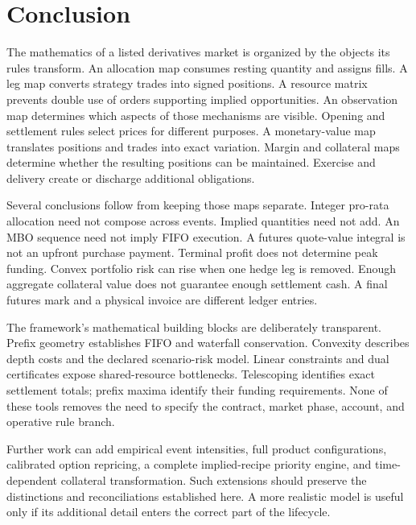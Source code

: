 \section{Conclusion}

The mathematics of a listed derivatives market is organized by the objects its rules transform. An allocation map consumes resting quantity and assigns fills. A leg map converts strategy trades into signed positions. A resource matrix prevents double use of orders supporting implied opportunities. An observation map determines which aspects of those mechanisms are visible. Opening and settlement rules select prices for different purposes. A monetary-value map translates positions and trades into exact variation. Margin and collateral maps determine whether the resulting positions can be maintained. Exercise and delivery create or discharge additional obligations.

Several conclusions follow from keeping those maps separate. Integer pro-rata allocation need not compose across events. Implied quantities need not add. An MBO sequence need not imply FIFO execution. A futures quote-value integral is not an upfront purchase payment. Terminal profit does not determine peak funding. Convex portfolio risk can rise when one hedge leg is removed. Enough aggregate collateral value does not guarantee enough settlement cash. A final futures mark and a physical invoice are different ledger entries.

The framework's mathematical building blocks are deliberately transparent. Prefix geometry establishes FIFO and waterfall conservation. Convexity describes depth costs and the declared scenario-risk model. Linear constraints and dual certificates expose shared-resource bottlenecks. Telescoping identifies exact settlement totals; prefix maxima identify their funding requirements. None of these tools removes the need to specify the contract, market phase, account, and operative rule branch.

Further work can add empirical event intensities, full product configurations, calibrated option repricing, a complete implied-recipe priority engine, and time-dependent collateral transformation. Such extensions should preserve the distinctions and reconciliations established here. A more realistic model is useful only if its additional detail enters the correct part of the lifecycle.
